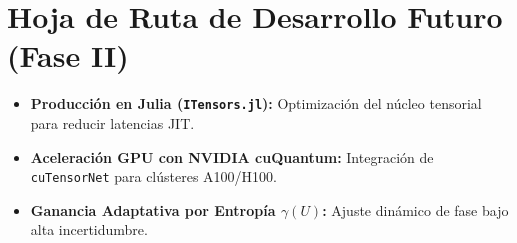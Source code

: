 \documentclass[11pt,a4paper,oneside]{report}
\begin{document}
\section{Hoja de Ruta de Desarrollo Futuro (Fase II)}
\begin{itemize}
    \item \textbf{Producción en Julia (\texttt{ITensors.jl}):} Optimización del núcleo tensorial para reducir latencias JIT.
    \item \textbf{Aceleración GPU con NVIDIA cuQuantum:} Integración de \texttt{cuTensorNet} para clústeres A100/H100.
    \item \textbf{Ganancia Adaptativa por Entropía $\gamma(U)$:} Ajuste dinámico de fase bajo alta incertidumbre.
\end{itemize}
\end{document}
